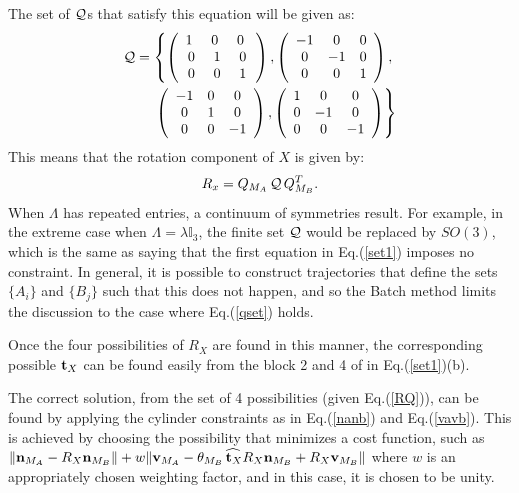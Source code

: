 \documentclass[twocolumn,10pt]{asme2ej}
\begin{document}
The set of ${\cal Q}$s that satisfy this equation will be given as:
\begin{equation}
\begin{split}
{\cal Q} = \left\{ \left(\begin{array}{ccc}
1\,\, & 0 \,\, & 0 \,\, \\
0 & 1 & 0\\
0 & 0 & 1 \end{array}\right) , \left(\begin{array}{ccc}
-1 & 0 & 0 \\
0 & -1 & 0\\
0 & 0 & 1 \end{array}\right), \right.\\
\left. \left(\begin{array}{ccc}
-1 & 0 & 0 \\
0 & 1 & 0\\
0 & 0 & -1 \end{array}\right), \left(\begin{array}{ccc}
1 & 0 & 0 \\
0 & -1 & 0\\
0 & 0 & -1 \end{array}\right)\right\}
\end{split} 
\label{qset}
\end{equation}
This means that the rotation component of $X$ is given by:
\begin{equation}
R_x=Q_{M_A}\,{\cal Q}\,Q_{M_B}^T.
\label{RQ}\end{equation}
When $\Lambda$ has repeated entries, a continuum of symmetries result. For example, in the extreme case when $\Lambda = \lambda \mathbb{I}_3$, the
finite set ${\cal Q}$ would be replaced by $SO(3)$, which is the same as saying that the first equation in Eq.(\ref{set1}) imposes no constraint. In general, it is possible to construct trajectories that define the sets $\{A_i\}$ and $\{B_j\}$ such that this does not happen, and so the Batch method limits the discussion to the case where Eq.(\ref{qset}) holds.

Once the four possibilities of $R_X$ are found in this manner, the corresponding possible ${\bf t}_X$ can be found easily from the block 2 and 4 of in Eq.(\ref{set1})(b).

The correct solution, from the set of 4 possibilities (given Eq.(\ref{RQ})), can be found by applying the cylinder constraints as in Eq.(\ref{nanb}) and Eq.(\ref{vavb}). This is achieved by choosing the possibility that minimizes a cost function, such as $\| {\bf n}_{M_A}-R_X {\bf n}_{M_B} \|+w \| {\bf v}_{M_A} - \theta_{M_B} \widehat{\,{\bf t}_X} R_X {\bf n}_{M_B} + R_X {\bf v}_{M_B} \|$
where $w$ is an appropriately chosen weighting factor, and in this case, it is chosen to be unity.
\end{document}
